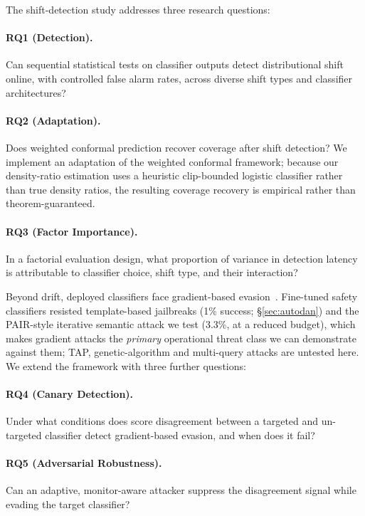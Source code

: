 \documentclass{article}
\begin{document}
The shift-detection study addresses three research questions:

\paragraph{RQ1 (Detection).} Can sequential statistical tests on classifier outputs detect distributional shift online, with controlled false alarm rates, across diverse shift types and classifier architectures?

\paragraph{RQ2 (Adaptation).} Does weighted conformal prediction recover coverage after shift detection? We implement an adaptation of the \citet{tibshirani2019conformal} weighted conformal framework; because our density-ratio estimation uses a heuristic clip-bounded logistic classifier rather than true density ratios, the resulting coverage recovery is empirical rather than theorem-guaranteed.

\paragraph{RQ3 (Factor Importance).} In a factorial evaluation design, what proportion of variance in detection latency is attributable to classifier choice, shift type, and their interaction?

Beyond drift, deployed classifiers face gradient-based evasion~\citep{zou2023universal}. Fine-tuned safety classifiers resisted template-based jailbreaks (1\% success; \S\ref{sec:autodan}) and the PAIR-style iterative semantic attack we test (3.3\%, at a reduced budget), which makes gradient attacks the \emph{primary} operational threat class we can demonstrate against them; TAP, genetic-algorithm and multi-query attacks are untested here. We extend the framework with three further questions:

\paragraph{RQ4 (Canary Detection).} Under what conditions does score disagreement between a targeted and un-targeted classifier detect gradient-based evasion, and when does it fail?

\paragraph{RQ5 (Adversarial Robustness).} Can an adaptive, monitor-aware attacker suppress the disagreement signal while evading the target classifier?
\end{document}
